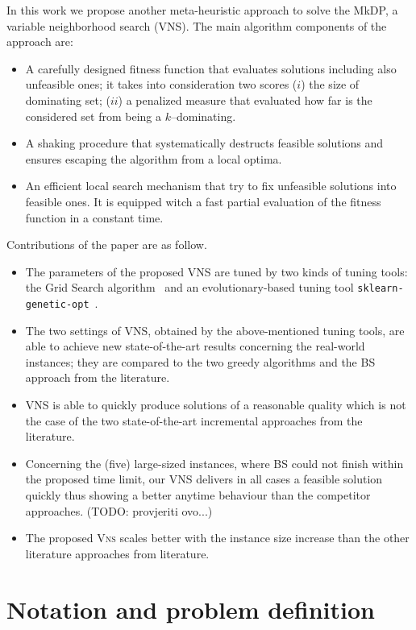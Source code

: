 \documentclass[sigconf]{acmart}
\begin{document}
In this work we propose another meta-heuristic approach to solve the MkDP, a variable neighborhood search (VNS). The main algorithm components of the approach are:
\begin{itemize}
	\item A carefully designed fitness function that evaluates solutions  including also unfeasible ones; it takes into consideration two scores ($i$) the size of dominating set; ($ii$) a penalized measure that evaluated how far is the considered set from being a $k$--dominating. 
	\item A shaking procedure that systematically destructs feasible solutions and ensures escaping the algorithm from a local optima.
	\item An efficient local search mechanism that try to fix unfeasible solutions into feasible ones. It is equipped witch a fast partial evaluation of the fitness function in a constant time.
 
\end{itemize}
Contributions of the paper are as follow.
\begin{itemize}
	\item The parameters of the proposed VNS are tuned by two kinds of tuning tools: the Grid Search algorithm~\cite{ranjan2019k} and an evolutionary-based tuning tool \texttt{sklearn-genetic-opt}~\cite{Arenas_Gomez2022}.  
	\item The two settings of VNS, obtained by the above-mentioned tuning tools, are able to achieve new state-of-the-art results concerning the real-world instances; they are compared to the two greedy algorithms and the BS approach from the literature. 
	\item VNS is able to quickly produce solutions of a reasonable quality which is not the case of the two state-of-the-art incremental approaches from the literature.
	\item Concerning the (five) large-sized instances, where BS could not finish within the proposed time limit, our VNS delivers in all cases a feasible solution quickly thus showing a better anytime behaviour than the competitor approaches. (TODO: provjeriti ovo...)
	\item The proposed \textsc{Vns} scales better with the instance size increase than the other literature approaches from literature. 
\end{itemize}

\section{Notation and problem definition }
    
\end{document}
